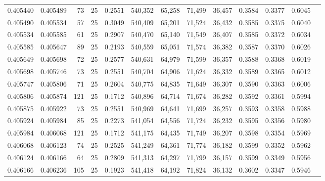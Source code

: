 \begin{tabular}{rrrrrrrrrrrrr}
0.405440 & 0.405489 &    73 &  25 &                                     0.2551 & 540,352 &  65,258 &  71,499 &  36,457 & 0.3584 & 0.3377 & 0.6045 \\
0.405490 & 0.405534 &    57 &  25 &                                     0.3049 & 540,409 &  65,201 &  71,524 &  36,432 & 0.3585 & 0.3375 & 0.6040 \\
0.405534 & 0.405585 &    61 &  25 &                                     0.2907 & 540,470 &  65,140 &  71,549 &  36,407 & 0.3585 & 0.3372 & 0.6034 \\
0.405585 & 0.405647 &    89 &  25 &                                     0.2193 & 540,559 &  65,051 &  71,574 &  36,382 & 0.3587 & 0.3370 & 0.6026 \\
0.405649 & 0.405698 &    72 &  25 &                                     0.2577 & 540,631 &  64,979 &  71,599 &  36,357 & 0.3588 & 0.3368 & 0.6019 \\
0.405698 & 0.405746 &    73 &  25 &                                     0.2551 & 540,704 &  64,906 &  71,624 &  36,332 & 0.3589 & 0.3365 & 0.6012 \\
0.405747 & 0.405806 &    71 &  25 &                                     0.2604 & 540,775 &  64,835 &  71,649 &  36,307 & 0.3590 & 0.3363 & 0.6006 \\
0.405806 & 0.405874 &   121 &  25 &                                     0.1712 & 540,896 &  64,714 &  71,674 &  36,282 & 0.3592 & 0.3361 & 0.5994 \\
0.405875 & 0.405922 &    73 &  25 &                                     0.2551 & 540,969 &  64,641 &  71,699 &  36,257 & 0.3593 & 0.3358 & 0.5988 \\
0.405924 & 0.405984 &    85 &  25 &                                     0.2273 & 541,054 &  64,556 &  71,724 &  36,232 & 0.3595 & 0.3356 & 0.5980 \\
0.405984 & 0.406068 &   121 &  25 &                                     0.1712 & 541,175 &  64,435 &  71,749 &  36,207 & 0.3598 & 0.3354 & 0.5969 \\
0.406068 & 0.406123 &    74 &  25 &                                     0.2525 & 541,249 &  64,361 &  71,774 &  36,182 & 0.3599 & 0.3352 & 0.5962 \\
0.406124 & 0.406166 &    64 &  25 &                                     0.2809 & 541,313 &  64,297 &  71,799 &  36,157 & 0.3599 & 0.3349 & 0.5956 \\
0.406166 & 0.406236 &   105 &  25 &                                     0.1923 & 541,418 &  64,192 &  71,824 &  36,132 & 0.3602 & 0.3347 & 0.5946 \\

\end{tabular}
